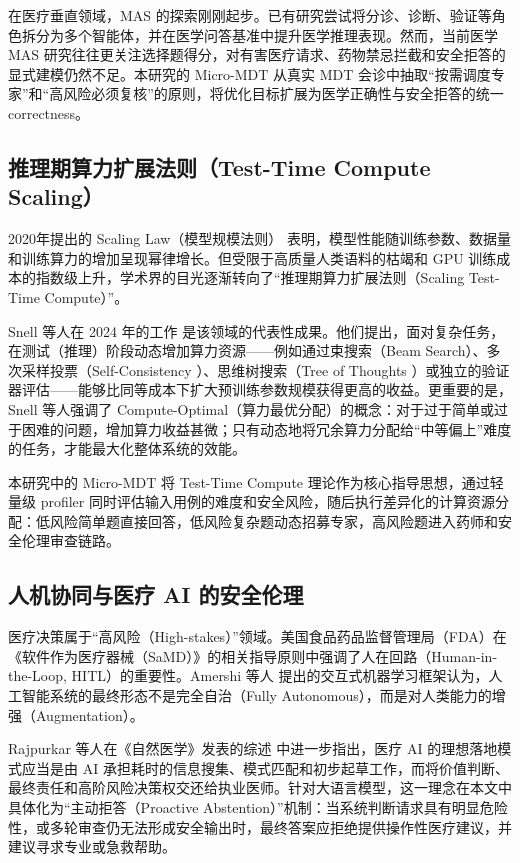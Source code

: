 \documentclass[11pt,a4paper]{ctexart}
\begin{document}
在医疗垂直领域，MAS 的探索刚刚起步。已有研究尝试将分诊、诊断、验证等角色拆分为多个智能体，并在医学问答基准中提升医学推理表现。然而，当前医学 MAS 研究往往更关注选择题得分，对有害医疗请求、药物禁忌拦截和安全拒答的显式建模仍然不足。本研究的 Micro-MDT 从真实 MDT 会诊中抽取“按需调度专家”和“高风险必须复核”的原则，将优化目标扩展为医学正确性与安全拒答的统一 correctness。

\subsection{推理期算力扩展法则（Test-Time Compute Scaling）}

2020年提出的 Scaling Law（模型规模法则） \cite{kaplan2020scaling} 表明，模型性能随训练参数、数据量和训练算力的增加呈现幂律增长。但受限于高质量人类语料的枯竭和 GPU 训练成本的指数级上升，学术界的目光逐渐转向了“推理期算力扩展法则（Scaling Test-Time Compute）”。

Snell 等人在 2024 年的工作 \cite{snell2024scaling} 是该领域的代表性成果。他们提出，面对复杂任务，在测试（推理）阶段动态增加算力资源——例如通过束搜索（Beam Search）、多次采样投票（Self-Consistency \cite{wang2023self}）、思维树搜索（Tree of Thoughts \cite{yao2024tree}）或独立的验证器评估——能够比同等成本下扩大预训练参数规模获得更高的收益。更重要的是，Snell 等人强调了 Compute-Optimal（算力最优分配）的概念：对于过于简单或过于困难的问题，增加算力收益甚微；只有动态地将冗余算力分配给“中等偏上”难度的任务，才能最大化整体系统的效能。

本研究中的 Micro-MDT 将 Test-Time Compute 理论作为核心指导思想，通过轻量级 profiler 同时评估输入用例的难度和安全风险，随后执行差异化的计算资源分配：低风险简单题直接回答，低风险复杂题动态招募专家，高风险题进入药师和安全伦理审查链路。

\subsection{人机协同与医疗 AI 的安全伦理}

医疗决策属于“高风险（High-stakes）”领域。美国食品药品监督管理局（FDA）在《软件作为医疗器械（SaMD）》的相关指导原则中强调了人在回路（Human-in-the-Loop, HITL）的重要性。Amershi 等人 \cite{amershi2014power} 提出的交互式机器学习框架认为，人工智能系统的最终形态不是完全自治（Fully Autonomous），而是对人类能力的增强（Augmentation）。

Rajpurkar 等人在《自然医学》发表的综述 \cite{rajpurkar2022ai} 中进一步指出，医疗 AI 的理想落地模式应当是由 AI 承担耗时的信息搜集、模式匹配和初步起草工作，而将价值判断、最终责任和高阶风险决策权交还给执业医师。针对大语言模型，这一理念在本文中具体化为“主动拒答（Proactive Abstention）”机制：当系统判断请求具有明显危险性，或多轮审查仍无法形成安全输出时，最终答案应拒绝提供操作性医疗建议，并建议寻求专业或急救帮助。
\end{document}
